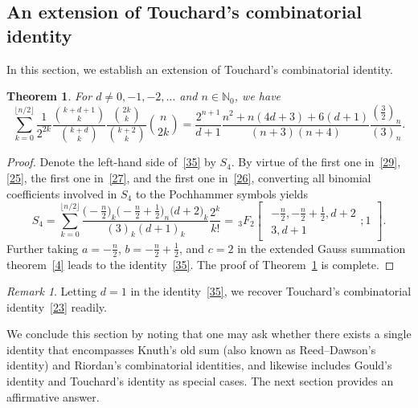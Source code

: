 \documentclass[reqno]{amsart}
\numberwithin{equation}{section}
\theoremstyle{plain}
\newtheorem{thm}{Theorem}[section]
\theoremstyle{remark}
\newtheorem{rem}{Remark}[section]
\begin{document}
\subsection{An extension of Touchard's combinatorial identity}\label{sec6}

In this section, we establish an extension of Touchard's combinatorial identity.

\begin{thm}\label{thm4}
For $d\neq 0,-1,-2,\dotsc$ and $n\in\mathbb{N}_0$, we have
\begin{equation}\label{35}
\sum_{k=0}^{\lfloor n/2\rfloor}\frac{1}{2^{2k}}\frac{\binom{k+d+1}{k}}{\binom{k+d}{k}} \frac{\binom{2k}{k}}{\binom{k+2}{k}}\binom{n}{2k}
=\frac{2^{n+1}}{d+1}\frac{n^{2}+n(4d+3)+6(d+1)}{(n+3)(n+4)}\frac{(\frac{3}{2})_{n}}{(3)_{n}}.
\end{equation}
\end{thm}
\begin{proof}
Denote the left-hand side of~\eqref{35} by $S_4$. By virtue of the first one in~\eqref{29}, \eqref{25}, the first one in~\eqref{27}, and the first one in~\eqref{26}, converting all binomial coefficients involved in $S_4$ to the Pochhammer symbols yields
$$
S_4=\sum_{k=0}^{\lfloor n/2\rfloor} \frac{\bigl(-\frac{n}2\bigr)_k\bigl(-\frac{n}2+\frac12\bigr)_n\bigl(d+2\bigr)_k}{(3)_k(d+1)_k}\frac{2^k}{k!}
={\,}_3F_2\begin{bmatrix}\begin{gathered}-\tfrac{n}{2}, -\tfrac{n}2+\tfrac12, d+2\\ 3, d+1 \end{gathered};1\end{bmatrix}.
$$
Further taking $a=-\frac{n}2$, $b=-\frac{n}2+\frac12$, and $c=2$ in the extended Gauss summation theorem~\eqref{4} leads to the identity~\eqref{35}.
The proof of Theorem~\ref{thm4} is complete.
\end{proof}

\begin{rem}
Letting $d=1$ in the identity~\eqref{35}, we recover Touchard's combinatorial identity~\eqref{23} readily.
\end{rem}

We conclude this section by noting that one may ask whether there exists a single identity that encompasses Knuth's old sum (also known as Reed--Dawson's identity) and Riordan's combinatorial identities, and likewise includes Gould's identity and Touchard's identity as special cases. The next section provides an affirmative answer.
\end{document}
